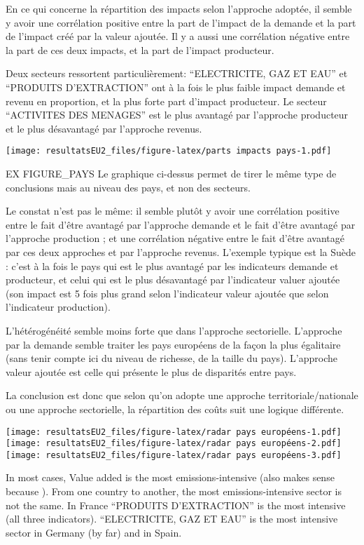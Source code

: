 \documentclass[
]{article}
\begin{document}
{{En ce qui concerne la répartition des impacts selon l'approche adoptée,
il semble y avoir une corrélation positive entre la part de l'impact de
la demande et la part de l'impact créé par la valeur ajoutée. Il y a
aussi une corrélation négative entre la part de ces deux impacts, et la
part de l'impact producteur.

Deux secteurs ressortent particulièrement: ``ELECTRICITE, GAZ ET EAU''
et ``PRODUITS D'EXTRACTION'' ont à la fois le plus faible impact demande
et revenu en proportion, et la plus forte part d'impact producteur. Le
secteur ``ACTIVITES DES MENAGES'' est le plus avantagé par l'approche
producteur et le plus désavantagé par l'approche revenus.

\texttt{[image: resultatsEU2\_files/figure-latex/parts impacts pays-1.pdf]}

EX FIGURE\_PAYS Le graphique ci-dessus permet de tirer le même type de
conclusions mais au niveau des pays, et non des secteurs.

Le constat n'est pas le même: il semble plutôt y avoir une corrélation
positive entre le fait d'être avantagé par l'approche demande et le fait
d'être avantagé par l'approche production ; et une corrélation négative
entre le fait d'être avantagé par ces deux approches et par l'approche
revenus. L'exemple typique est la Suède : c'est à la fois le pays qui
est le plus avantagé par les indicateurs demande et producteur, et celui
qui est le plus désavantagé par l'indicateur valuer ajoutée (son impact
est 5 fois plus grand selon l'indicateur valeur ajoutée que selon
l'indicateur production).

L'hétérogénéité semble moins forte que dans l'approche sectorielle.
L'approche par la demande semble traiter les pays européens de la façon
la plus égalitaire (sans tenir compte ici du niveau de richesse, de la
taille du pays). L'approche valeur ajoutée est celle qui présente le
plus de disparités entre pays.

La conclusion est donc que selon qu'on adopte une approche
territoriale/nationale ou une approche sectorielle, la répartition des
coûts suit une logique différente.

\texttt{[image: resultatsEU2\_files/figure-latex/radar pays européens-1.pdf]}
\texttt{[image: resultatsEU2\_files/figure-latex/radar pays européens-2.pdf]}
\texttt{[image: resultatsEU2\_files/figure-latex/radar pays européens-3.pdf]}

In most cases, Value added is the most emissions-intensive (also makes
sense because ). From one country to another, the most
emissions-intensive sector is not the same. In France ``PRODUITS
D'EXTRACTION'' is the most intensive (all three indicators).
``ELECTRICITE, GAZ ET EAU'' is the most intensive sector in Germany (by
far) and in Spain.

}}
\end{document}
